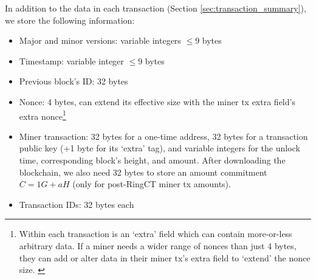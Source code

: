 In addition to the data in each transaction (Section \ref{sec:transaction_summary}), we store the following information:
\begin{itemize}
    \setlength\itemsep{\listspace}
    \item Major and minor versions: variable integers $\leq 9$ bytes
    \item Timestamp: variable integer $\leq 9$ bytes
    \item Previous block's ID: 32 bytes
    \item Nonce: 4 bytes, can extend its effective size with the miner tx extra field's extra nonce\footnote{Within each transaction is an `extra' field which can contain more-or-less arbitrary data. If a miner needs a wider range of nonces than just 4 bytes, they can add or alter data in their miner tx's extra field to `extend' the nonce size. \cite{extra-field-stackexchange}}
    \item Miner transaction: 32 bytes for a one-time address, 32 bytes for a transaction public key (+1 byte for its `extra' tag), and variable integers for the unlock time, corresponding block's height, and amount. After downloading the blockchain, we also need 32 bytes to store an amount commitment $C = 1G + a H$ (only for post-RingCT miner tx amounts).
    \item Transaction IDs: 32 bytes each
\end{itemize}
